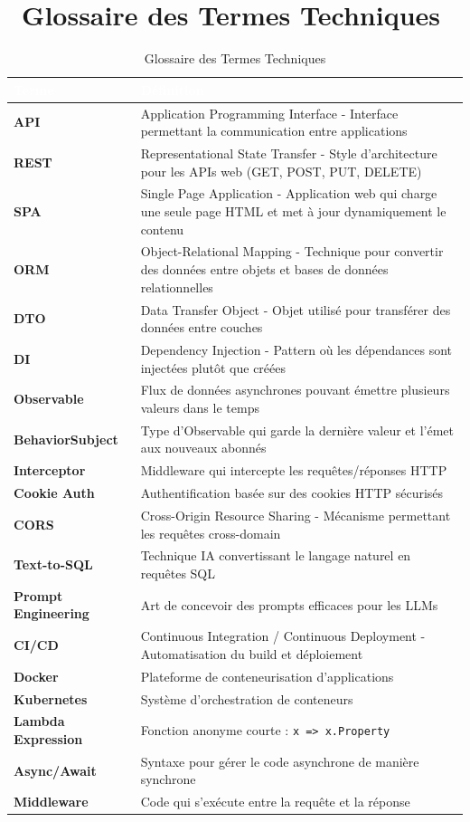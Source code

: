 \documentclass[12pt,a4paper]{article}
\begin{document}
\section{\faBookOpen\ Glossaire des Termes Techniques}

\begin{table}[H]
\centering
\small
{}
\begin{tabular}{|>{\bfseries}p{3.5cm}|p{10cm}|}
\hline
\rowcolor{primaryblue}
\textcolor{white}{\textbf{Terme}} & \textcolor{white}{\textbf{Définition}} \\
\hline
API & Application Programming Interface - Interface permettant la communication entre applications \\
\hline
REST & Representational State Transfer - Style d'architecture pour les APIs web (GET, POST, PUT, DELETE) \\
\hline
SPA & Single Page Application - Application web qui charge une seule page HTML et met à jour dynamiquement le contenu \\
\hline
ORM & Object-Relational Mapping - Technique pour convertir des données entre objets et bases de données relationnelles \\
\hline
DTO & Data Transfer Object - Objet utilisé pour transférer des données entre couches \\
\hline
DI & Dependency Injection - Pattern où les dépendances sont injectées plutôt que créées \\
\hline
Observable & Flux de données asynchrones pouvant émettre plusieurs valeurs dans le temps \\
\hline
BehaviorSubject & Type d'Observable qui garde la dernière valeur et l'émet aux nouveaux abonnés \\
\hline
Interceptor & Middleware qui intercepte les requêtes/réponses HTTP \\
\hline
Cookie Auth & Authentification basée sur des cookies HTTP sécurisés \\
\hline
CORS & Cross-Origin Resource Sharing - Mécanisme permettant les requêtes cross-domain \\
\hline
Text-to-SQL & Technique IA convertissant le langage naturel en requêtes SQL \\
\hline
Prompt Engineering & Art de concevoir des prompts efficaces pour les LLMs \\
\hline
CI/CD & Continuous Integration / Continuous Deployment - Automatisation du build et déploiement \\
\hline
Docker & Plateforme de conteneurisation d'applications \\
\hline
Kubernetes & Système d'orchestration de conteneurs \\
\hline
Lambda Expression & Fonction anonyme courte : \texttt{x => x.Property} \\
\hline
Async/Await & Syntaxe pour gérer le code asynchrone de manière synchrone \\
\hline
Middleware & Code qui s'exécute entre la requête et la réponse \\
\hline
\end{tabular}
\caption{Glossaire des Termes Techniques}
\end{table}
\end{document}
